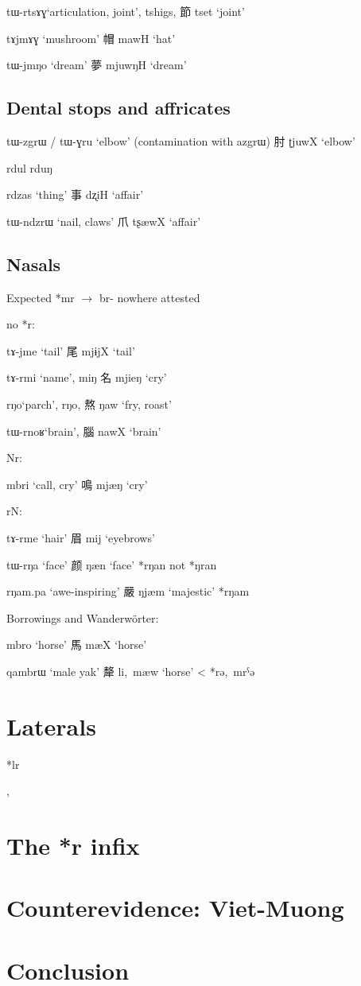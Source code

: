 \documentclass[oldfontcommands,oneside,a4paper,11pt]{article}
\newcommand{\ipa}[1]{{\phon \mbox{#1}}} %
\newcommand{\zh}[1]{{\cn #1}}
\newcommand{\ch}[3]{\zh{#1} \ipa{#2} `#3'}
\begin{document}
\ipa{tɯ-rtsɤɣ}`articulation, joint', \ipa{tshigs}, \ch{節}{tset}{joint}

\ipa{tɤjmɤɣ} `mushroom' \ch{帽}{mawH}{hat}

\ipa{tɯ-jmŋo} `dream' \ch{夢}{mjuwŋH}{dream}

\subsection{Dental stops and affricates}
\ipa{tɯ-zgrɯ} / \ipa{tɯ-ɣru} `elbow' (contamination with \ipa{azgrɯ})  \ch{肘}{ʈjuwX}{elbow}

rdul
rduŋ

\ipa{rdzas} `thing' \ch{事}{dʐiH}{affair}


\ipa{tɯ-ndzrɯ} `nail, claws' \ch{爪}{tʂæwX}{affair}
\subsection{Nasals}
Expected *\ipa{mr} $\rightarrow$ \ipa{br-} nowhere attested


no *r:

\ipa{tɤ-jme} `tail' \ch{尾}{mjɨjX}{tail}

\ipa{tɤ-rmi} `name', \ipa{miŋ} \ch{名}{mjieŋ}{cry} 

\ipa{rŋo}`parch', \ipa{rŋo}, \ch{熬}{ŋaw}{fry, roast}

\ipa{tɯ-rnoʁ}`brain', \ch{腦}{nawX}{brain}

Nr:

\ipa{mbri} `call, cry' \ch{鳴}{mjæŋ}{cry}


rN:

\ipa{tɤ-rme} `hair' \ch{眉}{mij}{eyebrows}

\ipa{tɯ-rŋa} `face' \ch{颜}{ŋæn}{face} *\ipa{rŋan} not *\ipa{ŋran}

\ipa{rŋam.pa} `awe-inspiring' \ch{嚴}{ŋjæm}{majestic} *\ipa{rŋam} \citet{coblin86handlist}


Borrowings and Wanderwörter:

\ipa{mbro} `horse' \ch{馬}{mæX}{horse}

\ipa{qambrɯ} `male yak' \ch{犛}{li, mæw}{horse} < *\ipa{rə, mrˁə}


\section{Laterals}

*lr

\citet[217-225]{starostin89}, \citet[36-40]{sagart99roc}
\citet[78]{baroni14invariant}

\citet{nikitina12logophoric}

\section{The *r infix}

 \citet{sagart99roc}

\section{Counterevidence: Viet-Muong}

\section{Conclusion}




\end{document}
